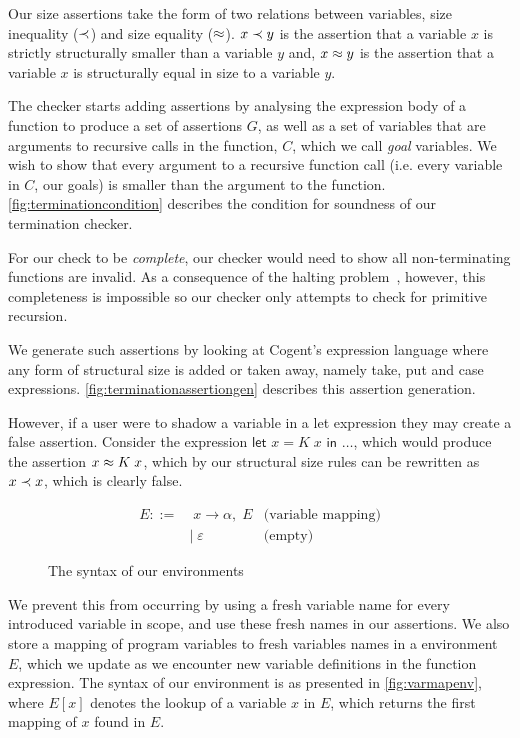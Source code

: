Our size assertions take the form of two relations between variables, 
size inequality ($\prec$) and size equality ($\approx$).
$x \prec y$ is the assertion that a variable $x$ is strictly
structurally smaller than a variable $y$ and, $x \approx y$ is the assertion that a
variable $x$ is structurally equal in size to a variable $y$.

The checker starts adding
assertions by analysing the expression body of a function to produce
a set of assertions $G$, as well as a set of variables that are arguments
to recursive calls in the function, $C$, which we call \emph{goal} variables.
We wish to show that every argument to a recursive 
function call (i.e. every variable in $C$, our goals) is smaller than the argument to 
the function. \autoref{fig:terminationcondition} describes the condition 
for soundness of our termination checker. 

For our check to be \emph{complete},
our checker would need to show all non-terminating functions are invalid.
As a consequence of the halting problem~\citep{HaltingProblem}, however, this completeness is impossible
so our checker only attempts to check for primitive recursion.

We generate such assertions by looking at Cogent's expression language 
where any form of structural size is added or taken away, namely
\textsf{take}, \textsf{put} and \textsf{case} expressions.
\autoref{fig:terminationassertiongen} describes this assertion generation.

However, if a user were to shadow a variable in a let expression they may
create a false assertion. Consider the expression 
$\textsf{let } x = K\; x \textsf{ in } \dots$, which would produce the
assertion $x \approx K\; x$, which by our structural size rules can be rewritten as
$x \prec x$, which is clearly false.

\begin{figure}
    \centering
    \begin{align*}
        E ::=&\; x \rightarrow \alpha,\; E  & \text{(variable mapping)} \\
             &|\; \varepsilon                 & \text{(empty)}
    \end{align*}
    \caption{The syntax of our environments}
    \label{fig:varmapenv}
\end{figure}

We prevent this from occurring by using a fresh variable name for every
introduced variable in scope, and use these fresh names in our assertions.
We also store a mapping of program variables to fresh variables names in a
environment $E$, which we update as we encounter new variable definitions in the
function expression. The syntax of our environment is as
presented in \autoref{fig:varmapenv}, where $E[x]$ denotes the lookup
of a variable $x$ in $E$, which returns the first mapping of $x$ found in $E$. 

